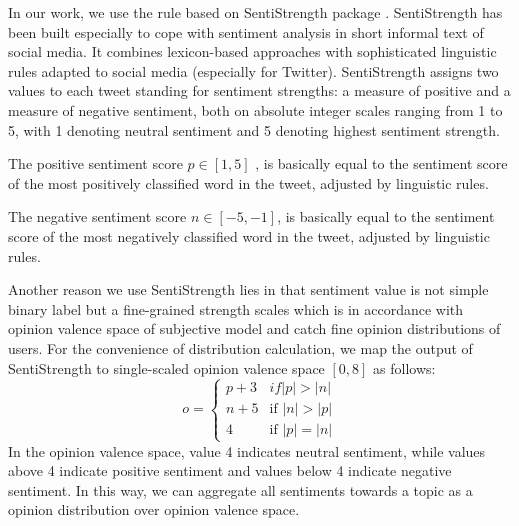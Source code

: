 \documentclass{acm_proc_article-sp}
\begin{document}
In our work, we use the rule based on SentiStrength package \cite{Thelwall:2010SSS}. 
SentiStrength has been built especially to cope with sentiment analysis in short informal text of social media. 
It combines lexicon-based approaches with sophisticated linguistic rules adapted to social media (especially for Twitter).
SentiStrength assigns two values to each tweet standing for sentiment strengths: a measure of positive and a measure of negative sentiment, both on absolute integer scales ranging from 1 to 5, with 1 denoting neutral sentiment and 5 denoting highest sentiment strength.
\begin{itemize*}
\item The positive sentiment score $ p \in \left[ 1, 5 \right]  $ , is basically equal to the sentiment score of the most positively classified word in the tweet, adjusted by linguistic rules.
\item The negative sentiment score $ n \in \left[ -5, -1 \right] $, is basically equal to the sentiment score of the most negatively classified word in the tweet, adjusted by linguistic rules.
\end{itemize*}
Another reason we use SentiStrength lies in that sentiment value is not simple binary label but a fine-grained strength scales which is in accordance with opinion valence space of subjective model and catch fine opinion distributions of users. 
For the convenience of distribution calculation, we map the output of SentiStrength to single-scaled opinion valence space $ \left[ 0, 8 \right] $ as follows:
\begin{equation}
\label{opinionmap}
o= \left\{ 
\begin{array}{lll}
{p+3} & if \vert p \vert > \vert n \vert \\
{n+5} & \text{if } \vert n \vert > \vert p \vert \\
{4}  & \text{if } \vert p \vert = \vert n \vert
\end{array}
\right.
\end{equation}
In the opinion valence space, value 4 indicates neutral sentiment, while values above 4 indicate positive sentiment and values below 4 indicate  negative sentiment. In this way, we can aggregate all sentiments towards a topic as a opinion distribution over opinion valence space.
\end{document}
